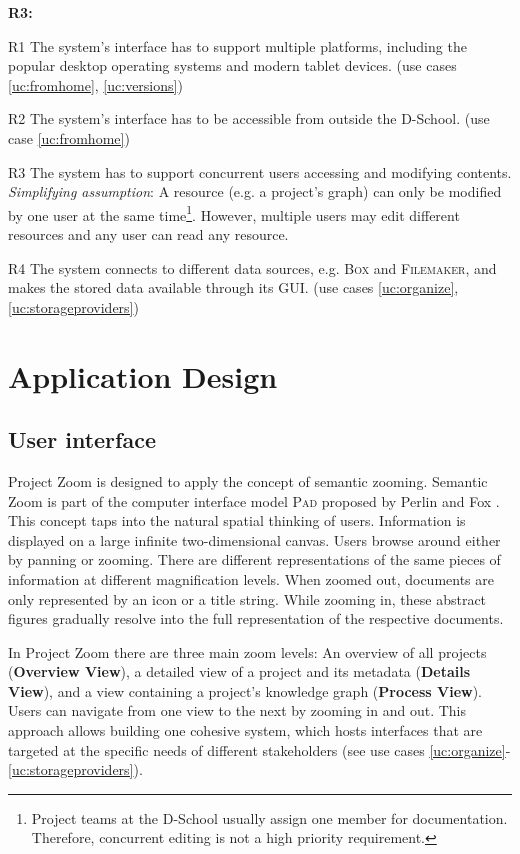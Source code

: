 \begin{labeling}{\textbf{R3:}}
\item[R1\label{req:multiplatform}] The system's interface has to support multiple platforms, including the popular desktop operating systems and modern tablet devices. (use cases \ref{uc:fromhome}, \ref{uc:versions})
\item[R2\label{req:fromhome}] The system's interface has to be accessible from outside the D-School. (use case \ref{uc:fromhome})
\item[R3\label{req:concurrency}] The system has to support concurrent users accessing and modifying contents. \textit{Simplifying assumption}: A resource (e.g. a project's graph) can only be modified by one user at the same time\footnote{Project teams at the D-School usually assign one member for documentation. Therefore, concurrent editing is not a high priority requirement.}. However, multiple users may edit different resources and any user can read any resource.
\item[R4\label{req:storageprovider}] The system connects to different data sources, e.g. \textsc{Box} and \textsc{Filemaker}, and makes the stored data available through its GUI. (use cases \ref{uc:organize}, \ref{uc:storageproviders})
\end{labeling}

\chapter{Application Design}
\section{User interface}
\label{sec:design}

Project Zoom is designed to apply the concept of semantic zooming. Semantic Zoom is part of the computer interface model \textsc{Pad} proposed by Perlin and Fox \cite{Perlin_1993}. This concept taps into the natural spatial thinking of users. Information is displayed on a large infinite two-dimensional canvas. Users browse around either by panning or zooming. There are different representations of the same pieces of information at different magnification levels. When zoomed out, documents are only represented by an icon or a title string. While zooming in, these abstract figures gradually resolve into the full representation of the respective documents. 

In Project Zoom there are three main zoom levels: An overview of all projects (\textbf{Overview View}), a detailed view of a project and its metadata (\textbf{Details View}), and a view containing a project's knowledge graph (\textbf{Process View}). Users can navigate from one view to the next by zooming in and out. This approach allows building one cohesive system, which hosts interfaces that are targeted at the specific needs of different stakeholders (see use cases \ref{uc:organize}-\ref{uc:storageproviders}). 

